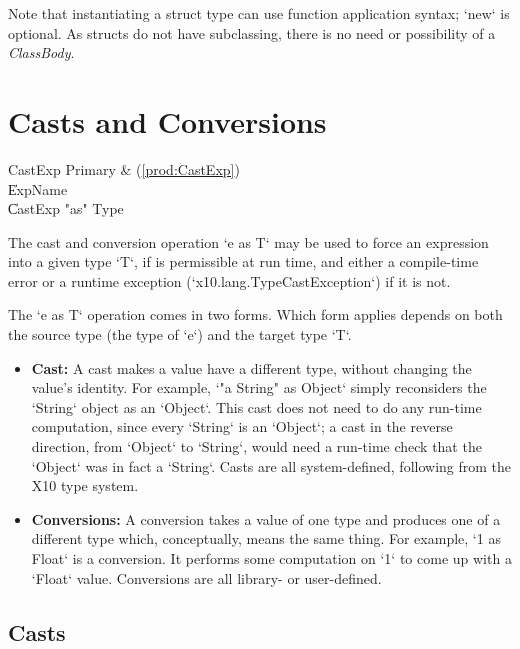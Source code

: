 Note that instantiating a struct type can use function application syntax; 
\xcd`new` is optional.  As structs do not have subclassing, there is no need or
possibility of a {\em ClassBody}.


\section{Casts and Conversions}\label{ClassCast}


\begin{bbgrammar}
             CastExp \: Primary & (\ref{prod:CastExp}) \\
                    \| ExpName \\
                    \| CastExp \xcd"as" Type \\
\end{bbgrammar}


The cast and conversion  operation \xcd`e as T` may be used to force an
expression into a given type \xcd`T`, 
if is permissible at run time, and either a compile-time error or a runtime
exception 
(\xcd`x10.lang.TypeCastException`) if it is not.  


The \xcd`e as T` operation comes in two forms.  Which form applies depends on
both the source type (the type of \xcd`e`) and the target type \xcd`T`.
\begin{itemize}
\item {\bf Cast:} A cast makes a value have a different type, without changing
      the value's identity.  For example, \xcd`"a String" as Object` simply
      reconsiders the \xcd`String` object as an \xcd`Object`.  
      This cast does not need to do any 
      run-time computation, since every \xcd`String` is an \xcd`Object`; a
      cast in the reverse direction, from \xcd`Object` to \xcd`String`, would
      need a run-time check that the \xcd`Object`
      was in fact a \xcd`String`.
      Casts are all system-defined, following from the
      X10 type system.
\item {\bf Conversions:} A conversion takes a value of one type and produces
      one of a different type which, conceptually, means the same thing.  
      For example, \xcd`1 as Float` is a conversion.  It performs some
      computation on \xcd`1`  to come up with a \xcd`Float` value.
      Conversions are all library- or user-defined.  
\end{itemize}

\subsection{Casts}

